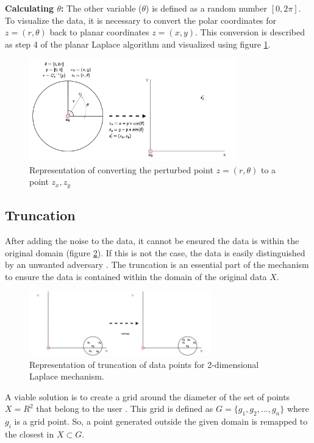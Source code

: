 \textbf{Calculating $\theta$:}
The other variable ($\theta$) is defined as a random number $[0, 2\pi]$. \newline
To visualize the data, it is necessary to convert the polar coordinates for $z = (r, \theta)$ back to planar coordinates $z = (x, y)$.
This conversion is described as step 4 of the planar Laplace algorithm \citep{DBLP:journals/corr/abs-1212-1984} and visualized using figure \ref{figure:geo}.
\begin{figure}[h]
  \includegraphics[width=0.8\textwidth]{TheorethicalFramework/ND-Laplace/Images/polar-laplace-to-planar.png}
  \centering
  \caption{Representation of converting the perturbed point $z = (r, \theta)$ to a point ${z_x, z_y}$}
  \label{figure:geo}
\end{figure}


\newpage
\subsection{Truncation} \label{theory:truncation}
After adding the noise to the data, it cannot be ensured the data is within the original domain (figure \ref{figure:truncation-2d}).
If this is not the case, the data is easily distinguished by an unwanted adversary \citep{DBLP:journals/corr/abs-1212-1984,9646489}.
The truncation is an essential part of the mechanism to ensure the data is contained within the domain of the original data $X$.
\begin{figure}[ht]
  \includegraphics[width=0.7\textwidth]{TheorethicalFramework/ND-Laplace/Images/remapping.png}
  \caption{Representation of truncation of data points for 2-dimensional Laplace mechanism.}
  \label{figure:truncation-2d}
\end{figure}
A viable solution is to create a grid around the diameter of the set of points $X = R^2$ that belong to the user \citep{DBLP:journals/corr/abs-1212-1984}.
This grid is defined as $G = \{g_1, g_2, ..., g_n\}$ where $g_i$ is a grid point.
So, a point generated outside the given domain is remapped to the closest in $X \subset G$.

